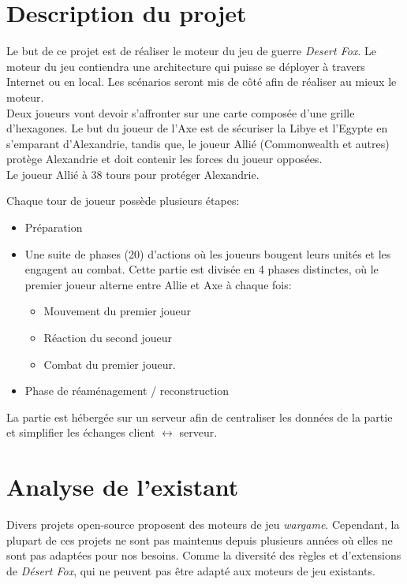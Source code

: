 \section{Description du projet}

Le but de ce projet est de réaliser le moteur du jeu de guerre \emph{Desert Fox}. Le moteur du jeu contiendra une architecture qui puisse se déployer à travers Internet ou en local. Les scénarios seront mis de côté afin de réaliser au mieux le moteur.\\

Deux joueurs vont devoir s'affronter sur une carte composée d'une grille d'hexagones. Le but du joueur de l'Axe est de sécuriser la Libye et l'Egypte en s'emparant d'Alexandrie, tandis que, le joueur Allié (Commonwealth et autres) protège Alexandrie et doit contenir les forces du joueur opposées.\\
Le joueur Allié à 38 tours pour protéger Alexandrie.

Chaque tour de joueur possède plusieurs étapes:
\begin{itemize}
    \item Préparation
    \item Une suite de phases (20) d'actions où les joueurs bougent leurs unités et les engagent au combat. Cette partie est divisée en 4 phases distinctes, où le premier joueur alterne entre Allie et Axe à chaque fois:
          \begin{itemize}
              \item Mouvement du premier joueur
              \item Réaction du second joueur
              \item Combat du premier joueur.
          \end{itemize}
    \item Phase de réaménagement / reconstruction
\end{itemize}


La partie est hébergée sur un serveur afin de centraliser les données de la partie et simplifier les échanges client $\leftrightarrow$ serveur.

\section{Analyse de l'existant}

Divers projets open-source proposent des moteurs de jeu \emph{wargame}. Cependant, la plupart de ces projets ne sont pas maintenus depuis plusieurs années où elles ne sont pas adaptées pour nos besoins. Comme la diversité des règles et d'extensions de \emph{Désert Fox}, qui ne peuvent pas être adapté aux moteurs de jeu existants.

